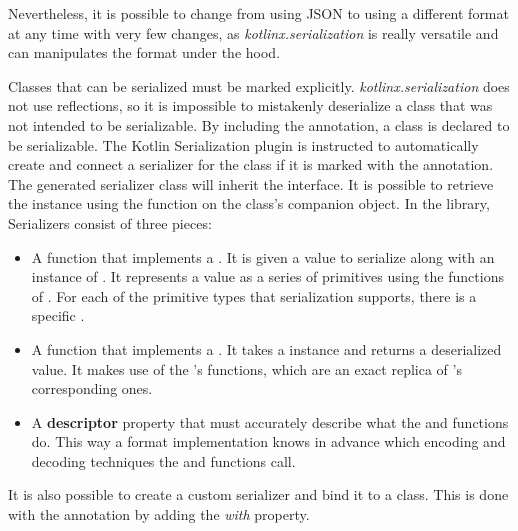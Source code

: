 Nevertheless, it is possible to change from using JSON to using a different format at any time with very few changes, as \textit{kotlinx.serialization} is really versatile and can manipulates the format under the hood.\newline

Classes that can be serialized must be marked explicitly. \textit{kotlinx.serialization} does not use reflections, so it is impossible to mistakenly deserialize a class that was not intended to be serializable. By including the  annotation, a class is declared to be serializable. The Kotlin Serialization plugin is instructed to automatically create and connect a serializer for the class if it is marked with the  annotation. The generated serializer class will inherit the  interface. It is possible to retrieve the instance using the  function on the class's companion object. In the library, Serializers consist of three pieces:

\begin{itemize}
	\item A  function that implements a . It is given a value to serialize along with an instance of . It represents a value as a series of primitives using the  functions of . For each of the primitive types that serialization supports, there is a specific .
	\item A  function that implements a . It takes a  instance and returns a deserialized value. It makes use of the 's  functions, which are an exact replica of 's corresponding ones.
	\item A \textbf{descriptor} property that must accurately describe what the  and  functions do. This way a format implementation knows in advance which encoding and decoding techniques the  and  functions call.
\end{itemize}

It is also possible to create a custom serializer and bind it to a class. This is done with the  annotation by adding the \textit{with} property.\newline

